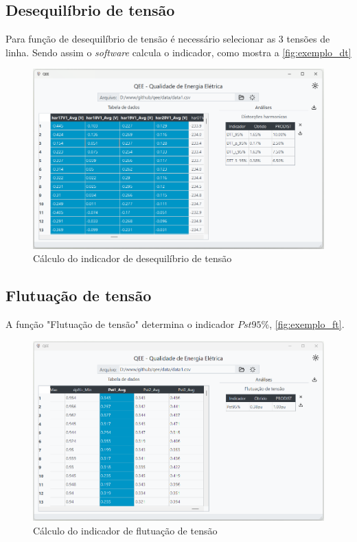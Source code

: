 \subsection{Desequilíbrio de tensão}

Para função de desequilíbrio de tensão é necessário selecionar as 3 tensões de linha. Sendo assim o \textit{software} calcula o indicador, como mostra a \autoref{fig:exemplo_dt}

\begin{figure}[H]
  \centering
  \caption{Cálculo do indicador de desequilíbrio de tensão}
  \label{fig:exemplo_dt}
  \includegraphics[width=15cm]{illustrations/figures/exemplo_dh.png}
\end{figure}

\subsection{Flutuação de tensão}

A função "Flutuação de tensão" determina o indicador $Pst95\%$, \autoref{fig:exemplo_ft}.

\begin{figure}[H]
  \centering
  \caption{Cálculo do indicador de flutuação de tensão}
  \label{fig:exemplo_ft}
  \includegraphics[width=15cm]{illustrations/figures/exemplo_ft.png}
\end{figure}

